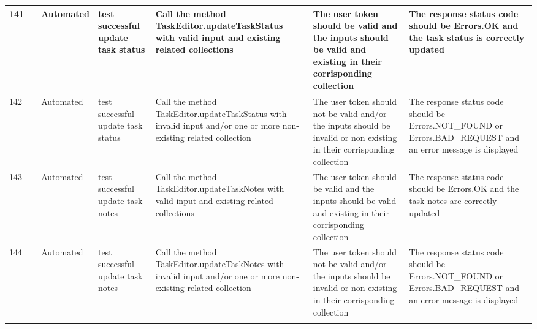 \documentclass{article}
\begin{document}
{\begin{tabular}{|
    >{\columncolor[HTML]{FFFFFF}}l |
    >{\columncolor[HTML]{FFFFFF}}c |
    >{\columncolor[HTML]{FFFFFF}}l |l|l|l|l|}
    141                                 & \cellcolor[HTML]{FFFFFF}                                    & {\color[HTML]{11734B} Automated} & test successful update task status                  & Call the method TaskEditor.updateTaskStatus with valid input and existing related collections                              & The user token should be valid and the inputs should be valid and existing in their corrisponding collection                                             & The response status code should be Errors.OK and the task status is correctly updated                         \\ \cline{1-1} \cline{3-7} 
    142                                 & \cellcolor[HTML]{FFFFFF}                                    & {\color[HTML]{11734B} Automated} & test successful update task status                  & Call the method TaskEditor.updateTaskStatus with invalid input and/or one or more non-existing related collection          & The user token should not be valid and/or the inputs should be invalid or non existing in their corrisponding collection                                 & The response status code should be Errors.NOT\_FOUND or Errors.BAD\_REQUEST and an error message is displayed \\ \cline{1-1} \cline{3-7} 
    143                                 & \cellcolor[HTML]{FFFFFF}                                    & {\color[HTML]{11734B} Automated} & test successful update task notes                   & Call the method TaskEditor.updateTaskNotes with valid input and existing related collections                               & The user token should be valid and the inputs should be valid and existing in their corrisponding collection                                             & The response status code should be Errors.OK and the task notes are correctly updated                         \\ \cline{1-1} \cline{3-7} 
    144                                 & \cellcolor[HTML]{FFFFFF}                                    & {\color[HTML]{11734B} Automated} & test successful update task notes                   & Call the method TaskEditor.updateTaskNotes with invalid input and/or one or more non-existing related collection           & The user token should not be valid and/or the inputs should be invalid or non existing in their corrisponding collection                                 & The response status code should be Errors.NOT\_FOUND or Errors.BAD\_REQUEST and an error message is displayed \\ \cline{1-1} \cline{3-7} 

\end{tabular}}
\end{document}

